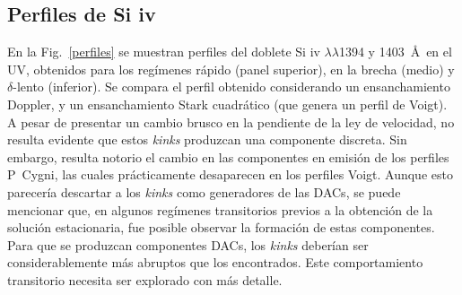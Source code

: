 \documentclass[baaa]{baaa}
\begin{document}
\subsection{Perfiles de Si {\sc iv}}
En la Fig.~\ref{perfiles} se muestran perfiles del doblete Si {\sc iv} $\lambda\lambda$1394 y 1403~\AA~en el UV, obtenidos para los reg\'imenes r\'apido (panel superior), en la brecha (medio) y $\delta$-lento (inferior). Se compara el perfil obtenido considerando un ensanchamiento Doppler, y un ensanchamiento Stark cuadr\'atico (que genera un perfil de Voigt). A pesar de presentar un cambio brusco en la pendiente de la ley de velocidad, no resulta evidente que estos \textit{kinks} produzcan una componente discreta. Sin embargo, resulta notorio el cambio en las componentes en emisi\'on de los perfiles P~Cygni, las cuales pr\'acticamente desaparecen en los perfiles Voigt. Aunque esto parecer\'ia descartar a los \textit{kinks} como generadores de las DACs, se puede mencionar que, en algunos reg\'imenes transitorios previos a la obtenci\'on de la soluci\'on estacionaria, fue posible observar la formaci\'on de estas componentes. Para que se produzcan componentes DACs, los \textit{kinks} deber\'ian ser considerablemente m\'as abruptos que los encontrados. Este comportamiento transitorio necesita ser explorado con m\'as detalle.
\end{document}
